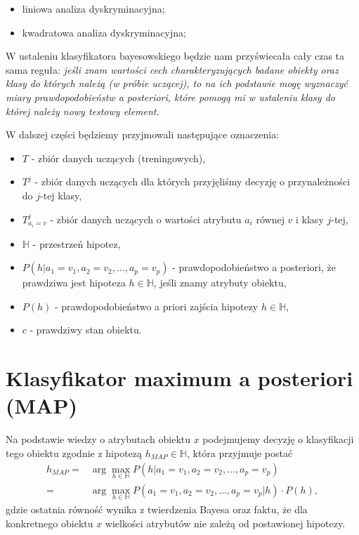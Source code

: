\documentclass[]{book}
\providecommand{\tightlist}{%
  \setlength{\itemsep}{0pt}\setlength{\parskip}{0pt}}
\theoremstyle{plain}
\theoremstyle{definition}
\theoremstyle{definition}
\theoremstyle{definition}
\theoremstyle{definition}
\theoremstyle{remark}
\begin{document}
\begin{itemize}
\tightlist
\item
  liniowa analiza dyskryminacyjna;
\item
  kwadratowa analiza dyskryminacyjna;
\end{itemize}

W ustaleniu klasyfikatora bayesowskiego będzie nam przyświecała cały czas ta sama reguła: \emph{jeśli znam wartości cech charakteryzujących badane obiekty oraz klasy do których należą (w próbie uczącej), to na ich podstawie mogę wyznaczyć miary prawdopodobieństw a posteriori, które pomogą mi w ustaleniu klasy do której należy nowy testowy element.}

W dalszej części będziemy przyjmowali następujące oznaczenia:

\begin{itemize}
\tightlist
\item
  \(T\) - zbiór danych uczących (treningowych),
\item
  \(T^j\) - zbiór danych uczących dla których przyjęliśmy decyzję o przynależności do \(j\)-tej klasy,
\item
  \(T^j_{a_i=v}\) - zbiór danych uczących o wartości atrybutu \(a_i\) równej \(v\) i klasy \(j\)-tej,
\item
  \(\mathbb{H}\) - przestrzeń hipotez,
\item
  \(P(h|a_1=v_1, a_2=v_2,\ldots,a_p=v_p)\) - prawdopodobieństwo a posteriori, że prawdziwa jest hipoteza \(h\in \mathbb{H}\), jeśli znamy atrybuty obiektu,
\item
  \(P(h)\) - prawdopodobieństwo a priori zajścia hipotezy \(h\in \mathbb{H}\),
\item
  \(c\) - prawdziwy stan obiektu.
\end{itemize}

\hypertarget{klasyfikator-maximum-a-posteriori-map}{%
\section{Klasyfikator maximum a posteriori (MAP)}\label{klasyfikator-maximum-a-posteriori-map}}

Na podstawie wiedzy o atrybutach obiektu \(x\) podejmujemy decyzję o klasyfikacji tego obiektu zgodnie z hipotezą \(h_{MAP}\in \mathbb{H}\), która przyjmuje postać
\begin{align}\label{MAP}
        h_{MAP}=&\operatorname{arg}\max_{h\in \mathbb{H}}P(h|a_1=v_1, a_2=v_2,\ldots,a_p=v_p)\\
            =& \operatorname{arg}\max_{h\in \mathbb{H}}P(a_1=v_1, a_2=v_2,\ldots,a_p=v_p|h)\cdot P(h),
\end{align}
gdzie ostatnia równość wynika z twierdzenia Bayesa oraz faktu, że dla konkretnego obiektu \(x\) wielkości atrybutów nie zależą od postawionej hipotezy.
\end{document}
